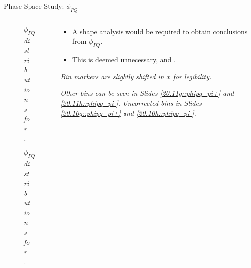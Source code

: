 \begin{frame}{Phase Space Study: $\phi_{PQ}$}
    \label{12.16::phipq}

    \begin{columns}[onlytextwidth,T]

    \begin{column}{.44\linewidth}
        \vspace{-15pt}
        \begin{center}
            \begin{figure}[t]
                \scriptsize{\textit{$\phi_{PQ}$ distributions for \ef{$\pi^-$}.}}
            \end{figure}

            \vspace{-9pt}
            \begin{figure}[t]
                \scriptsize{\textit{$\phi_{PQ}$ distributions for \ef{$\pi^+$}.}}
            \end{figure}
        \end{center}
    \end{column}

    \begin{column}{.54\linewidth}
        \begin{itemize}
            \item
                A shape analysis would be required to obtain conclusions from $\phi_{PQ}$.

            \vspace{12pt}
            \item
                This is deemed unnecessary, and .
        \end{itemize}

        \vspace{119pt}

        \begin{flushright}
            \tiny{\textit{Bin markers are slightly shifted in $x$ for legibility.}}

            \tiny{\textit{
                Other bins can be seen in Slides \textcolor{efd_purple}{\ref{20.11g::phipq_pi+}} and \textcolor{efd_purple}{\ref{20.11h::phipq_pi-}}.
                Uncorrected bins in Slides \textcolor{efd_purple}{\ref{20.10g::phipq_pi+}} and \textcolor{efd_purple}{\ref{20.10h::phipq_pi-}}.
            }}
        \end{flushright}
    \end{column}

    \end{columns}
\end{frame}

